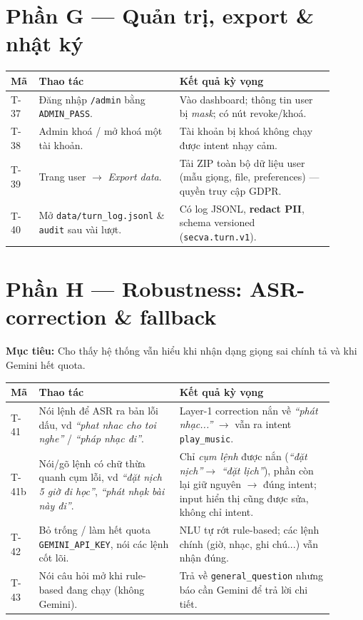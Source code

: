 \documentclass[12pt,a4paper]{article}
\newcommand{\role}[1]{\par\smallskip\noindent\textbf{\textcolor{hdr}{Mục tiêu:}} #1\par\smallskip}
\newcommand{\say}[1]{\textit{``#1''}}
\begin{document}
\section{Phần G --- Quản trị, export \& nhật ký}
\begin{table}[H]
\centering\small
\begin{tabular}{p{0.06\linewidth}p{0.40\linewidth}p{0.44\linewidth}}
\toprule
\textbf{Mã} & \textbf{Thao tác} & \textbf{Kết quả kỳ vọng} \\
\midrule
T-37 & Đăng nhập \texttt{/admin} bằng \texttt{ADMIN\_PASS}. & Vào dashboard;
thông tin user bị \emph{mask}; có nút revoke/khoá. \\
T-38 & Admin khoá / mở khoá một tài khoản. & Tài khoản bị khoá không chạy
được intent nhạy cảm. \\
T-39 & Trang user $\to$ \emph{Export data}. & Tải ZIP toàn bộ dữ liệu user
(mẫu giọng, file, preferences) --- quyền truy cập GDPR. \\
T-40 & Mở \texttt{data/turn\_log.jsonl} \& \texttt{audit} sau vài lượt. & Có log
JSONL, \textbf{redact PII}, schema versioned (\texttt{secva.turn.v1}). \\
\bottomrule
\end{tabular}
\end{table}

\section{Phần H --- Robustness: ASR-correction \& fallback}
\role{Cho thấy hệ thống vẫn hiểu khi nhận dạng giọng sai chính tả và khi Gemini
hết quota.}

\begin{table}[H]
\centering\small
\begin{tabular}{p{0.06\linewidth}p{0.40\linewidth}p{0.44\linewidth}}
\toprule
\textbf{Mã} & \textbf{Thao tác} & \textbf{Kết quả kỳ vọng} \\
\midrule
T-41 & Nói lệnh để ASR ra bản lỗi dấu, vd \say{phat nhac cho toi nghe} /
\say{pháp nhạc đi}. & Layer-1 correction nắn về \say{phát nhạc...} $\to$ vẫn ra
intent \texttt{play\_music}. \\
T-41b & Nói/gõ lệnh có chữ thừa quanh cụm lỗi, vd \say{đặt nịch 5 giờ đi học},
\say{phát nhạk bài này đi}. & Chỉ \emph{cụm lệnh} được nắn (\say{đặt nịch}$\to$
\say{đặt lịch}), phần còn lại giữ nguyên $\to$ đúng intent; input hiển thị cũng
được sửa, không chỉ intent. \\
T-42 & Bỏ trống / làm hết quota \texttt{GEMINI\_API\_KEY}, nói các lệnh cốt lõi. &
NLU tự rớt rule-based; các lệnh chính (giờ, nhạc, ghi chú...) vẫn nhận đúng. \\
T-43 & Nói câu hỏi mở khi rule-based đang chạy (không Gemini). & Trả về
\texttt{general\_question} nhưng báo cần Gemini để trả lời chi tiết. \\
\bottomrule
\end{tabular}
\end{table}
\end{document}
